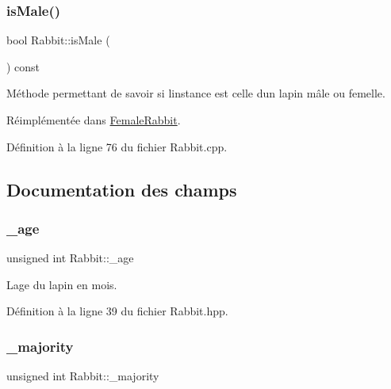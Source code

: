 \subsubsection{\texorpdfstring{is\+Male()}{isMale()}}
{\footnotesize\ttfamily bool Rabbit\+::is\+Male (\begin{DoxyParamCaption}{ }\end{DoxyParamCaption}) const\hspace{0.3cm}{\ttfamily [virtual]}}



Méthode permettant de savoir si l\textquotesingle{}instance est celle d\textquotesingle{}un lapin mâle ou femelle. 



Réimplémentée dans \hyperlink{classFemaleRabbit_a60250dbc3758c7d31537f13b4879fe33}{Female\+Rabbit}.



Définition à la ligne 76 du fichier Rabbit.\+cpp.



\subsection{Documentation des champs}
\mbox{\label{classRabbit_a396c4c8693ea4f827f12afd6d1320ec0}} 
\subsubsection{\texorpdfstring{\+\_\+age}{\_age}}
{\footnotesize\ttfamily unsigned int Rabbit\+::\+\_\+age\hspace{0.3cm}{\ttfamily [protected]}}



L\textquotesingle{}age du lapin en mois. 



Définition à la ligne 39 du fichier Rabbit.\+hpp.

\mbox{\label{classRabbit_a7cf441478e82d384166605c69f99f39e}} 
\subsubsection{\texorpdfstring{\+\_\+majority}{\_majority}}
{\footnotesize\ttfamily unsigned int Rabbit\+::\+\_\+majority\hspace{0.3cm}{\ttfamily [protected]}}



